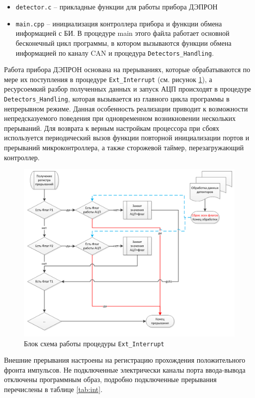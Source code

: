\begin{itemize}
	\item 	\texttt{detector.c} -- прикладные функции для работы прибора ДЭПРОН
	
	
	\item \texttt{main.cpp} -- инициализация контроллера прибора и функции обмена информацией с БИ. В процедуре main этого файла работает основной бесконечный цикл программы, в котором вызываются функции обмена информацией по каналу CAN и процедура \texttt{Detectors\_Handling}.
	
	
\end{itemize}
Работа прибора ДЭПРОН основана на прерываниях, которые обрабатываются по мере их поступления в процедуре \texttt{Ext\_Interrupt} (см. рисунок \ref{fig:ext_interrupt}), а ресурсоемкий разбор полученных данных и запуск АЦП происходят в процедуре \texttt{Detectors\_Handling}, которая вызывается из главного цикла программы в непрерывном режиме. 
Данная особенность реализации приводит к возможности непредсказуемого поведения при одновременном возникновении нескольких прерываний. 
Для возврата к верным настройкам процессора при сбоях используется периодический вызов функции повторной инициализации портов и прерываний микроконтроллера, а также сторожевой таймер, перезагружающий контроллер.
\begin{figure}
\centering
\includegraphics[width=0.7\linewidth]{images/ext_interrupt}
\caption{Блок схема работы процедуры \texttt{Ext\_Interrupt}}
\label{fig:ext_interrupt}
\end{figure}

Внешние прерывания настроены на регистрацию прохождения положительного фронта импульсов. Не подключенные электрически каналы порта ввода-вывода отключены программным образ, подробно подключенные прерывания перечислены в таблице \ref{tab:int}.

